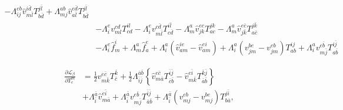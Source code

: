 \documentclass[a4paper,12pt,oneside]{book}
\newcommand{\half}{\frac{1}{2}}
\newcommand{\spa}[1]{{#1}}
\newcommand{\spb}[1]{\bar{#1}}
\begin{document}
\begin{equation}
\begin{aligned}
- Λ_{\spa{i}\spa{j}}^{\spa{e}\spa{b}} 
\hat v_{\spa{m}\spb{l}}^{\spa{i}\spb{d}} T^{\spa{j}\spb{l}}_{\spa{b}\spb{d}} 
+ Λ_{\spa{m}\spa{j}}^{\spa{a}\spa{b}}
\hat v_{\spa{a}\spb{l}}^{\spa{e}\spb{d}} T^{\spa{j}\spb{l}}_{\spa{b}\spb{d}} \\
&-Λ_{\spa{i}}^{\spa{e}} v_{\spa{m}\spa{l}}^{\spa{c}\spa{d}} T^{\spa{i}\spa{l}}_{\spa{c}\spa{d}}  
-Λ_{\spa{i}}^{\spa{e}} v_{\spa{m}\spb{l}}^{\spa{c}\spb{d}} T^{\spa{i}\spb{l}}_{\spa{c}\spb{d}}
- Λ_{\spa{m}}^{\spa{a}} \hat v_{\spa{j}\spa{k}}^{\spa{e}\spa{c}} T^{\spa{j}\spa{k}}_{\spa{a}\spa{c}}
- Λ_{\spa{m}}^{\spa{a}} \hat v_{\spa{j}\spb{k}}^{\spa{e}\spb{c}} T^{\spa{j}\spb{k}}_{\spa{a}\spb{c}}\\
&-Λ_{\spa{i}}^{\spa{e}} \hat f_{\spa{m}}^{\spa{i}} 
+Λ_{\spa{m}}^{\spa{a}} \hat f_{\spa{a}}^{\spa{e}} 
+Λ_{\spa{i}}^{\spa{a}} \left(\hat v_{\spa{a}\spa{m}}^{\spa{i}\spa{e}} - \hat v_{\spa{a}\spa{m}}^{\spa{e}\spa{i}} \right)
+ Λ_{\spa{i}}^{\spa{a}} \left(v_{\spa{j}\spa{m}}^{\spa{b}\spa{e}} - v_{\spa{j}\spa{m}}^{\spa{e}\spa{b}} \right) T^{\spa{i}\spa{j}}_{\spa{a}\spa{b}} 
+ Λ_{\spa{i}}^{\spa{a}} v_{\spa{m}\spb{j}}^{\spa{e}\spb{b}} T^{\spa{i}\spb{j}}_{\spa{a}\spb{b}} 
\end{aligned}
\end{equation}

\begin{equation}
\begin{aligned}
\frac{\partial\mathcal{L}_{\beta}}{\partial T^{\spa{m}}_{\spa{e}}}&=
\half v_{\spa{m}\spb{k}}^{\spa{e}\spb{c}} T^{\spb{k}}_{\spb{c}}
 + \half Λ_{\spb{i}\spb{j}}^{\spb{a}\spb{b}} \left\{
  \hat v_{\spa{m}\spb{a}}^{\spa{e}\spb{c}} T^{\spb{i}\spb{j}}_{\spb{c}\spb{b}}
- \hat v_{\spa{m}\spb{k}}^{\spa{e}\spb{i}} T^{\spb{k}\spb{j}}_{\spb{a}\spb{b}} \right\}\\
&+Λ_{\spb{i}}^{\spb{a}} \hat v_{\spa{m}\spb{a}}^{\spa{e}\spb{i}} 
+ Λ_{\spb{i}}^{\spb{a}} v_{\spa{m}\spb{j}}^{\spa{e}\spb{b}} T^{\spb{i}\spb{j}}_{\spb{a}\spb{b}} 
+ Λ_{\spb{i}}^{\spb{a}} \left(v_{\spa{m}\spa{j}}^{\spa{e}\spa{b}} - v_{\spa{m}\spa{j}}^{\spa{b}\spa{e}} \right) T^{\spa{j}\spb{i}}_{\spa{b}\spb{a}}, 
\end{aligned}
\end{equation}
\end{document}
